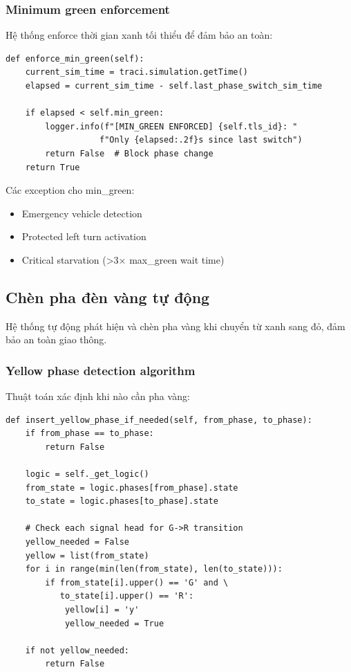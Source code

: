 \documentclass[12pt,a4paper,oneside]{report}
\begin{document}
\subsubsection{Minimum green enforcement}

Hệ thống enforce thời gian xanh tối thiểu để đảm bảo an toàn:

\begin{lstlisting}[style=py, caption={Minimum green time enforcement}]
def enforce_min_green(self):
    current_sim_time = traci.simulation.getTime()
    elapsed = current_sim_time - self.last_phase_switch_sim_time
    
    if elapsed < self.min_green:
        logger.info(f"[MIN_GREEN ENFORCED] {self.tls_id}: "
                   f"Only {elapsed:.2f}s since last switch")
        return False  # Block phase change
    return True
\end{lstlisting}

Các exception cho min\_green:
\begin{itemize}
    \item Emergency vehicle detection
    \item Protected left turn activation
    \item Critical starvation (>3× max\_green wait time)
\end{itemize}

\subsection{Chèn pha đèn vàng tự động}

Hệ thống tự động phát hiện và chèn pha vàng khi chuyển từ xanh sang đỏ, đảm bảo an toàn giao thông.

\subsubsection{Yellow phase detection algorithm}

Thuật toán xác định khi nào cần pha vàng:

\begin{lstlisting}[style=py, caption={Yellow phase necessity detection}]
def insert_yellow_phase_if_needed(self, from_phase, to_phase):
    if from_phase == to_phase:
        return False
        
    logic = self._get_logic()
    from_state = logic.phases[from_phase].state
    to_state = logic.phases[to_phase].state
    
    # Check each signal head for G->R transition
    yellow_needed = False
    yellow = list(from_state)
    for i in range(min(len(from_state), len(to_state))):
        if from_state[i].upper() == 'G' and \
           to_state[i].upper() == 'R':
            yellow[i] = 'y'
            yellow_needed = True
    
    if not yellow_needed:
        return False
\end{lstlisting}
\end{document}
